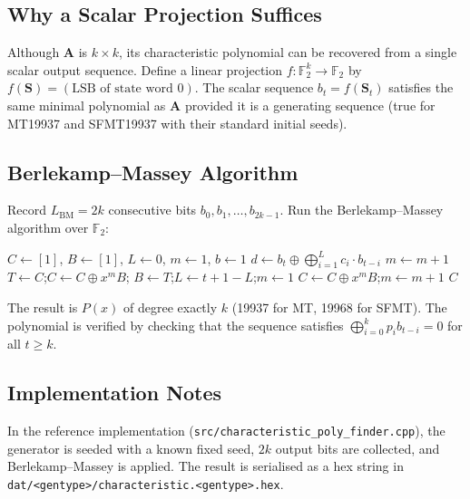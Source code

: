 \documentclass{article}
\begin{document}
\subsection{Why a Scalar Projection Suffices}

Although $\mathbf{A}$ is $k \times k$, its characteristic polynomial can be recovered from
a single scalar output sequence.  Define a linear projection
$f : \mathbb{F}_2^k \to \mathbb{F}_2$ by $f(\mathbf{S}) = (\text{LSB of state word 0})$.
The scalar sequence $b_t = f(\mathbf{S}_t)$ satisfies the same minimal polynomial as
$\mathbf{A}$ provided it is a generating sequence (true for MT19937 and SFMT19937 with
their standard initial seeds).

\subsection{Berlekamp--Massey Algorithm}

Record $L_\text{BM} = 2k$ consecutive bits $b_0, b_1, \ldots, b_{2k-1}$.  Run the
Berlekamp--Massey algorithm over $\mathbb{F}_2$:

\begin{algorithm}
\caption{Berlekamp--Massey over $\mathbb{F}_2$}
\begin{algorithmic}[1]
\State $C \leftarrow [1]$, $B \leftarrow [1]$, $L \leftarrow 0$, $m \leftarrow 1$,
       $b \leftarrow 1$
  \State $d \leftarrow b_t \oplus \bigoplus_{i=1}^{L} c_i \cdot b_{t-i}$
    \State $m \leftarrow m + 1$
    \State $T \leftarrow C$;\quad $C \leftarrow C \oplus x^m B$;\quad
           $B \leftarrow T$;\quad $L \leftarrow t+1-L$;\quad $m \leftarrow 1$
  \Else
    \State $C \leftarrow C \oplus x^m B$;\quad $m \leftarrow m + 1$
  \EndIf
\EndFor
\State \Return $C$ 
\end{algorithmic}
\end{algorithm}

The result is $P(x)$ of degree exactly $k$ (19937 for MT, 19968 for SFMT).  The polynomial
is verified by checking that the sequence satisfies $\bigoplus_{i=0}^{k} p_i b_{t-i} = 0$
for all $t \geq k$.

\subsection{Implementation Notes}

In the reference implementation (\texttt{src/characteristic\_poly\_finder.cpp}),
the generator is seeded with a known fixed seed, $2k$ output bits are collected, and
Berlekamp--Massey is applied.  The result is serialised as a hex string in
\texttt{dat/<gentype>/characteristic.<gentype>.hex}.
\end{document}
